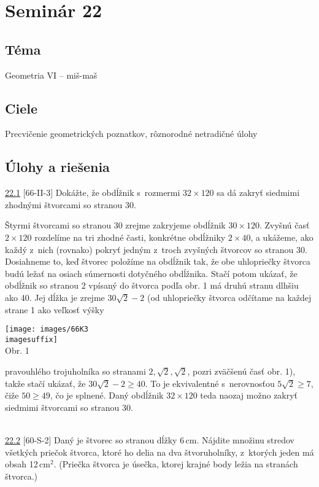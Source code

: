 \section*{Seminár 22}
\subsection*{Téma}
Geometria VI -- miš-maš
\subsection*{Ciele}
Precvičenie geometrických poznatkov, rôznorodné netradičné úlohy

\subsection*{Úlohy a riešenia}
\begin{tcolorbox}[breakable,notitle,boxrule=0pt,colback=light-gray,colframe=light-gray]\ul{22.1} [66-II-3] Dokážte, že obdĺžnik s~rozmermi $32 \times 120$ sa dá zakryť siedmimi zhodnými štvorcami so stranou 30.

\end{tcolorbox}

\rieh Štyrmi štvorcami so stranou 30 zrejme zakryjeme obdĺžnik $30\times 120$. Zvyšnú časť $2 \times 120$ rozdelíme na tri zhodné časti, konkrétne obdĺžniky $2 \times 40$, a ukážeme, ako každý z~nich (rovnako) pokryť jedným z~troch zvyšných štvorcov so stranou 30. Dosiahneme to, keď štvorec položíme na obdĺžnik tak, že obe uhlopriečky štvorca budú ležať na osiach súmernosti dotyčného obdĺžnika. Stačí potom ukázať, že obdĺžnik so stranou 2 vpísaný do štvorca podľa obr. 1 má druhú stranu dlhšiu ako 40. Jej dĺžka je zrejme $30\sqrt{2}-2$ (od uhlopriečky štvorca odčítame na každej strane 1 ako veľkosť výšky
\begin{center}
\texttt{[image: images/66K3\\imagesuffix]} \\

Obr. 1
\end{center}
pravouhlého trojuholníka so stranami $2, \sqrt{2}, \sqrt{2}$, pozri zväčšenú časť obr. 1), takže stačí ukázať, že $30\sqrt{2}-2\geq 40$. To je ekvivalentné s~nerovnosťou $5\sqrt{2}\geq 7$, čiže $50 \geq 49$, čo je splnené. Daný obdĺžnik $32 \times 120$ teda naozaj možno zakryť siedmimi štvorcami so stranou 30.\\
\\
\begin{tcolorbox}[breakable,notitle,boxrule=0pt,colback=light-gray,colframe=light-gray]\ul{22.2} [60-S-2]  Daný je štvorec so stranou dĺžky 6\,cm. Nájdite množinu stredov všetkých priečok štvorca, ktoré ho delia na dva štvoruholníky, z~ktorých jeden má obsah 12\,cm$^2$. (Priečka štvorca je úsečka, ktorej krajné body ležia na stranách štvorca.)

\end{tcolorbox}

